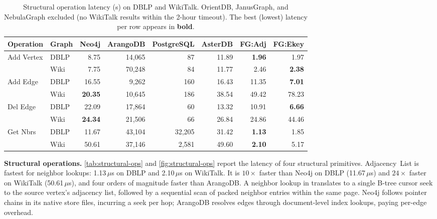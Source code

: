 \begin{table}[t]
  \centering
  \setlength{\tabcolsep}{2pt}
  \begin{tabular*}{\columnwidth}{@{\extracolsep{\fill}}ll rrrrrr@{}}
    \toprule
    Operation & Graph & Neo4j & ArangoDB & PostgreSQL & AsterDB & FG:Adj & FG:Ekey \\
    \midrule
    \multirow{2}{*}{Add Vertex}
    & DBLP & 8.75 & 14{,}065 & 87 & 11.89 & \textbf{1.96} & 1.97 \\
    & Wiki & 7.75 & 70{,}248 & 84 & 11.77 & 2.46 & \textbf{2.38} \\
    \midrule
    \multirow{2}{*}{Add Edge}
    & DBLP & 16.55 & 9{,}262 & 160 & 16.43 & 11.35 & \textbf{7.01} \\
    & Wiki & \textbf{20.35} & 10{,}645 & 186 & 38.54 & 49.42 & 78.23 \\
    \midrule
    \multirow{2}{*}{Del Edge}
    & DBLP & 22.09 & 17{,}864 & 60 & 13.32 & 10.91 & \textbf{6.66} \\
    & Wiki & \textbf{24.34} & 21{,}506 & 66 & 26.84 & 24.86 & 44.46 \\
    \midrule
    \multirow{2}{*}{Get Nbrs}
    & DBLP & 11.67 & 43{,}104 & 32{,}205 & 31.42 & \textbf{1.13} & 1.85 \\
    & Wiki & 50.61 & 37{,}146 & 2{,}581 & 49.60 & \textbf{2.10} & 5.17 \\
    \bottomrule
  \end{tabular*}
  \caption{Structural operation latency (\textmu{}s) on DBLP and WikiTalk.
    OrientDB, JanusGraph, and NebulaGraph excluded (no WikiTalk results within the 2-hour timeout).
    The best (lowest) latency per row appears in \textbf{bold}.}
  \label{tab:structural-ops}
\end{table}

\textbf{Structural operations.}
\autoref{tab:structural-ops} and \autoref{fig:structural-ops} report the latency of four structural primitives.
\project{} Adjacency~List is fastest for neighbor lookups: 1.13\,$\mu$s on DBLP and 2.10\,$\mu$s on WikiTalk.
It is $10\times$ faster than Neo4j on DBLP (11.67\,$\mu$s) and $24\times$ faster on WikiTalk (50.61\,$\mu$s), and four orders of magnitude faster than ArangoDB.
A neighbor lookup in \project{} translates to a single B-tree cursor seek to the source vertex's adjacency list, followed by a sequential scan of packed neighbor entries within the same page.
Neo4j follows pointer chains in its native store files, incurring a seek per hop; ArangoDB resolves edges through document-level index lookups, paying per-edge overhead.

